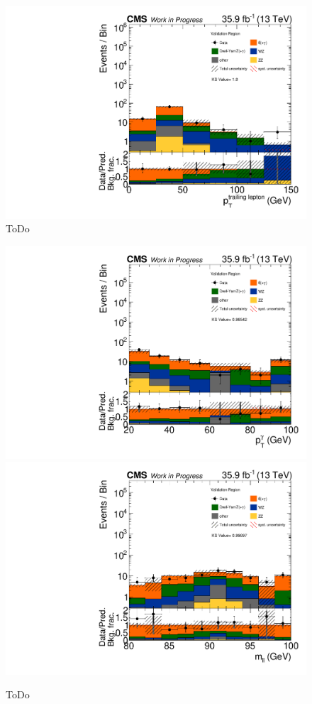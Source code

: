 \begin{figure}[tbp]
 \includegraphics[width=\pairwidth]{figures/plots_VR/VR_LL_pt2_log}
 \caption{ToDo}
 \label{fig:VR1}
\end{figure}


\begin{figure}[tbp]
 \centering
 \includegraphics[width=\pairwidth]{figures/plots_VR/VR_LL_pt_g1_log}
 \includegraphics[width=\pairwidth]{figures/plots_VR/VR_LL_m_ll_log}
 \caption{ToDo}
 \label{fig:VR2}
\end{figure}


